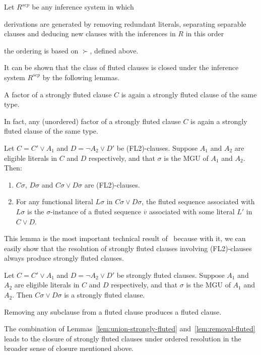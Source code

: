 \begin{definition}
  Let \(R^{sep}\) be any inference system in which
  \begin{enumerate*}[label = (\roman*)]
    \item derivations are generated by removing redundant literals, separating separable clauses and deducing new clauses with the inferences in \(R\) in this order
    \item the ordering is based on \(\succ\), defined above.
  \end{enumerate*}
\end{definition}
It can be shown that the class of fluted clauses is closed under the inference system \(R^{sep}\) by the following lemmas.

\begin{lemma}\label{lem:factor-strongly-fluted}
  A factor of a strongly fluted clause \(C\) is again a strongly fluted clause of the same type.
\end{lemma}
In fact, any (unordered) factor of a strongly fluted clause \(C\) is again a strongly fluted clause of the same type.

\begin{lemma}
  Let \(C = C' \lor A_1\) and \(D = \neg A_2 \lor D'\) be (FL2)-clauses.
  Suppose \(A_1\) and \(A_2\) are eligible literals in \(C\) and \(D\) respectively, and that \(\sigma\) is the MGU of \(A_1\) and \(A_2\).
  Then:
  \begin{enumerate}
    \item \(C\sigma\), \(D\sigma\) and \(C\sigma \lor D\sigma\) are (FL2)-clauses.
    \item For any functional literal \(L\sigma\) in \(C\sigma \lor D\sigma\), the fluted sequence associated with \(L\sigma\) is the \(\sigma\)-instance of a fluted sequence \(\overline{v}\) associated with some literal \(L'\) in \(C \lor D\).
  \end{enumerate}
\end{lemma}
This lemma is the most important technical result of~\cite{hustadt2000resolution} because with it, we can easily show that the resolution of strongly fluted clauses involving (FL2)-clauses always produce strongly fluted clauses.
\begin{lemma}\label{lem:union-strongly-fluted}
  Let \(C = C' \lor A_1\) and \(D = \neg A_2 \lor D'\) be strongly fluted clauses. Suppose \(A_1\) and \(A_2\) are eligible literals in \(C\) and \(D\) respectively, and that \(\sigma\) is the MGU of \(A_1\) and \(A_2\).
  Then \(C\sigma \lor D\sigma\) is a strongly fluted clause.
\end{lemma}
\begin{lemma}\label{lem:removal-fluted}
  Removing any subclause from a fluted clause produces a fluted clause.
\end{lemma}
The combination of Lemmas~\ref{lem:union-strongly-fluted} and~\ref{lem:removal-fluted} leads to the closure of strongly fluted clauses under ordered resolution in the broader sense of closure mentioned above.


